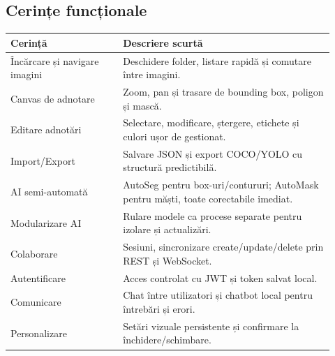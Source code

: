 \subsection{Cerințe funcționale}
\renewcommand{\arraystretch}{1.2}
\begin{center}
\begin{tabular}{|p{0.32\linewidth}|p{0.6\linewidth}|}
\hline
\textbf{Cerință} & \textbf{Descriere scurtă} \\
\hline
Încărcare și navigare imagini & Deschidere folder, listare rapidă și comutare între imagini. \\
\hline
Canvas de adnotare & Zoom, pan și trasare de bounding box, poligon și mască. \\
\hline
Editare adnotări & Selectare, modificare, ștergere, etichete și culori ușor de gestionat. \\
\hline
Import/Export & Salvare JSON și export COCO/YOLO cu structură predictibilă. \\
\hline
AI semi-automată & AutoSeg pentru box-uri/contururi;
AutoMask pentru măști, toate corectabile imediat. \\
\hline
Modularizare AI & Rulare modele ca procese separate pentru izolare și actualizări. \\
\hline
Colaborare & Sesiuni, sincronizare create/update/delete prin REST și WebSocket. \\
\hline
Autentificare & Acces controlat cu JWT și token salvat local. \\
\hline
Comunicare & Chat între utilizatori și chatbot local pentru întrebări și erori. \\
\hline
Personalizare & Setări vizuale persistente și confirmare la închidere/schimbare. \\
\hline
\end{tabular}
\end{center}

